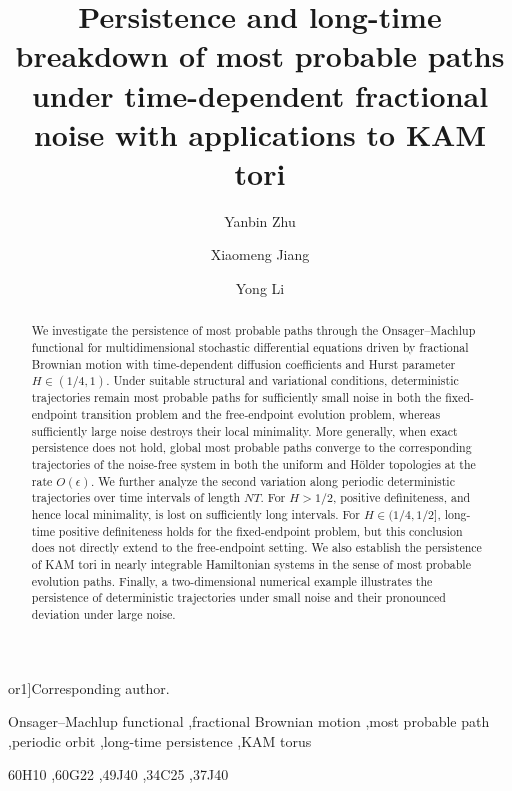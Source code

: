 \documentclass[preprint,12pt]{elsarticle}
\def\corref#1{}%
\def\cortext#1#2{}%
\theoremstyle{definition}
\theoremstyle{plain}
\begin{document}
\begin{frontmatter}

\title{Persistence and long-time breakdown of most probable paths under
time-dependent fractional noise with applications to KAM tori}

\author[inst1]{Yanbin Zhu}

\author[inst1]{Xiaomeng Jiang}

\author[inst1]{Yong Li\corref{cor1}}

\cortext[cor1]{Corresponding author.}


\begin{abstract}
We investigate the persistence of most probable paths through the
Onsager--Machlup functional for multidimensional stochastic differential
equations driven by fractional Brownian motion with time-dependent diffusion
coefficients and Hurst parameter $H\in(1/4,1)$. Under suitable structural and
variational conditions, deterministic trajectories remain most probable paths
for sufficiently small noise in both the fixed-endpoint transition problem and
the free-endpoint evolution problem, whereas sufficiently large noise destroys
their local minimality. More generally, when exact persistence does not hold,
global most probable paths converge to the corresponding trajectories of the
noise-free system in both the uniform and H\"older topologies at the rate
$O(\epsilon)$. We further analyze the second variation along periodic
deterministic trajectories over time intervals of length $NT$. For $H>1/2$,
positive definiteness, and hence local minimality, is lost on sufficiently long
intervals. For $H\in(1/4,1/2]$, long-time positive definiteness holds for the
fixed-endpoint problem, but this conclusion does not directly extend to the
free-endpoint setting. We also establish the persistence of KAM tori in nearly
integrable Hamiltonian systems in the sense of most probable evolution paths.
Finally, a two-dimensional numerical example illustrates the persistence of
deterministic trajectories under small noise and their pronounced deviation
under large noise.
\end{abstract}
\begin{keyword}
Onsager--Machlup functional
\sep fractional Brownian motion
\sep most probable path
\sep periodic orbit
\sep long-time persistence
\sep KAM torus

\MSC[2020] 60H10
\sep 60G22
\sep 49J40
\sep 34C25
\sep 37J40
\end{keyword}

\end{frontmatter}
\end{document}
